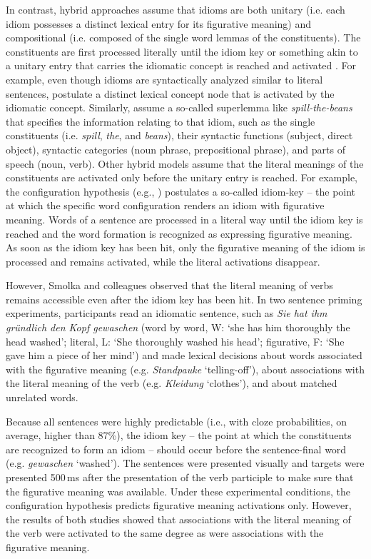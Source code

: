 \documentclass[output=paper]{langsci/langscibook}
\begin{document}
In contrast, hybrid approaches assume that idioms are both unitary (i.e. each idiom possesses a distinct lexical entry for its figurative meaning) and compositional (i.e. composed of the single word lemmas of the constituents). The constituents are first processed literally until the idiom key or something akin to a unitary entry that carries the idiomatic concept is reached and activated \citep{cacciari:1988,caillies:2007,connine:1992,cutting:1997,gibbs:1989,holsinger:2013,sprenger:2006,titone:1999}. For example, even though idioms are syntactically analyzed similar to literal sentences, \citet{cutting:1997} postulate a distinct lexical concept node that is activated by the idiomatic concept. Similarly, \citet{sprenger:2006} assume a so-called superlemma like \textit{spill-the-beans} that specifies the information relating to that idiom, such as the single constituents (i.e. \textit{spill}, \textit{the}, and \textit{beans}), their syntactic functions (subject, direct object), syntactic categories (noun phrase, prepositional phrase), and parts of speech (noun, verb). Other hybrid models assume that the literal meanings of the constituents are activated only before the unitary entry is reached. For example, the configuration hypothesis (e.g., \citealt{cacciari:1988}) postulates a so-called idiom-key – the point at which the specific word configuration renders an idiom with figurative meaning. Words of a sentence are processed in a literal way until the idiom key is reached and the word formation is recognized as expressing figurative meaning. As soon as the idiom key has been hit, only the figurative meaning of the idiom is processed and remains activated, while the literal activations disappear. 

However, Smolka and colleagues \citep{rabanus:2008,smolka:2007} observed that the literal meaning of verbs remains accessible even after the idiom key has been hit. In two sentence priming experiments, participants read an idiomatic sentence, such as \textit{Sie hat ihm gründlich den Kopf gewaschen} (word by word, W: ‘she has him thoroughly the head washed’; literal, L: ‘She thoroughly washed his head’; figurative, F: `She gave him a piece of her mind') and made lexical decisions about words associated with the figurative meaning (e.g. \textit{Standpauke} ‘telling-off’), about associations with the literal meaning of the verb (e.g. \textit{Kleidung} ‘clothes’), and about matched unrelated words. 

Because all sentences were highly predictable (i.e., with cloze probabilities, on average, higher than 87\%), the idiom key -- the point at which the constituents are recognized to form an idiom -- should occur before the sentence-final word (e.g. \textit{gewaschen} ‘washed’). The sentences were presented visually and targets were presented 500\,ms after the presentation of the verb participle to make sure that the figurative meaning was available. Under these experimental conditions, the configuration hypothesis \citep{cacciari:1988} predicts figurative meaning activations only. However, the results of both studies showed that associations with the literal meaning of the verb were activated to the same degree as were associations with the figurative meaning.  
\end{document}
